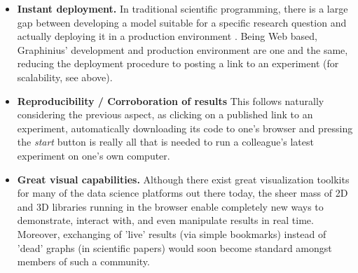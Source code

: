 \begin{itemize}
	\item \textbf{Instant deployment.} In traditional scientific programming, there is a large gap between developing a model suitable for a specific research question and actually deploying it in a production environment \citep{AnalLifecycle}. Being Web based, Graphinius' development and production environment are one and the same, reducing the deployment procedure to posting a link to an experiment (for scalability, see above).
	
	\item \textbf{Reproducibility / Corroboration of results}
	This follows naturally considering the previous aspect, as clicking on a published link to an experiment, automatically downloading its code to one's browser and pressing the \textit{start} button is really all that is needed to run a colleague's latest experiment on one's own computer.
	
	\item \textbf{Great visual capabilities.} Although there exist great visualization toolkits for many of the data science platforms out there today, the sheer mass of 2D and 3D libraries running in the browser enable completely new ways to demonstrate, interact with, and even manipulate results in real time. Moreover, exchanging of 'live' results (via simple bookmarks) instead of 'dead' graphs (in scientific papers) would soon become standard amongst members of such a community.
\end{itemize}
